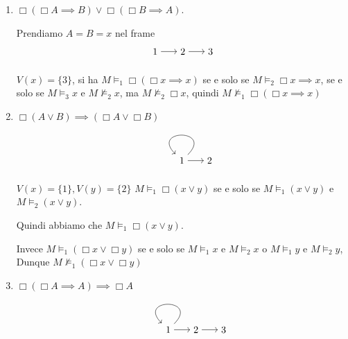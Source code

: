 \documentclass[../main.tex]{subfiles}
\begin{document}
\begin{enumerate}
          Scelgo $V(A) = V(B) = \{1\}$ quindi
          \begin{itemize}
              \item $M \vDash_2 \Box (A \implies B)$
              \item $M \vDash_2 \Box A$
          \end{itemize}
          ma $M \nvDash_2 \Diamond B$, perchè non esiste $v \in \{1,2\}$ t.c $M \vDash_v B$ e $(2,v) \in R$
    \item $\Box (\Box A \implies B) \lor \Box (\Box B \implies A)$.

          Prendiamo $A = B = x$ nel frame
          \begin{equation*}
              \begin{tikzpicture}[->]
                  \node (1) {1};
                  \node (2) [right of=1] {2};
                  \node (3) [right of=2] {3};
                  \path
                  (1) edge node {} (2)
                  (2) edge node {} (3);
              \end{tikzpicture}
          \end{equation*}

          $V(x) = \{3\}$, si ha $M \vDash_1 \Box (\Box x \implies x)$ se e solo se $M \vDash_2 \Box x \implies x$, se e solo se $M \vDash_3 x$ e $M \nvDash_2 x$, ma $M \nvDash_2 \Box x$, quindi $M \nvDash_1 \Box (\Box x \implies x)$
    \item $\Box (A \lor B) \implies (\Box A \lor \Box B)$
          \begin{equation*}
              \begin{tikzpicture}[->]
                  \node (1) {1};
                  \node (2) [right of=1] {2};
                  \path
                  (1) edge[loop] node {} (1)
                  (1) edge node {} (2);
              \end{tikzpicture}
          \end{equation*}

          $V(x) = \{1\}, V(y) = \{2\}$ $M \vDash_1 \Box (x \lor y)$ se e solo se $M \vDash_1 (x \lor y)$ e $M \vDash_2 (x \lor y)$.

          Quindi abbiamo che $M \vDash_1 \Box (x \lor y)$.

          Invece $M \vDash_1 (\Box x \lor \Box y)$ se e solo se $M \vDash_1 x$ e $M \vDash_2 x$ o $M \vDash_1 y$ e $M \vDash_2 y$, Dunque $M \nvDash_1 (\Box x \lor \Box y)$
    \item $\Box(\Box A \implies A) \implies \Box A$
          \begin{equation*}
              \begin{tikzpicture}[->]
                  \node (1) {1};
                  \node (2) [right of=1] {2};
                  \node (3) [right of=2] {3};
                  \path
                  (1) edge[loop] node {} (1)
                  (1) edge node {} (2)
                  (2) edge node {} (3);
              \end{tikzpicture}
          \end{equation*}


\end{enumerate}
\end{document}
